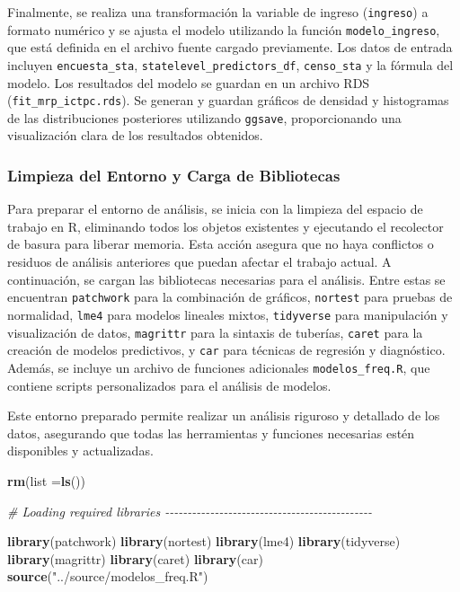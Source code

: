 \documentclass[
  12pt,
]{book}
\newenvironment{Shaded}{\begin{snugshade}}{\end{snugshade}}
\newcommand{\AttributeTok}[1]{\textcolor[rgb]{0.13,0.29,0.53}{#1}}
\newcommand{\CommentTok}[1]{\textcolor[rgb]{0.56,0.35,0.01}{\textit{#1}}}
\newcommand{\FunctionTok}[1]{\textcolor[rgb]{0.13,0.29,0.53}{\textbf{#1}}}
\newcommand{\NormalTok}[1]{#1}
\newcommand{\StringTok}[1]{\textcolor[rgb]{0.31,0.60,0.02}{#1}}
\begin{document}
Finalmente, se realiza una transformación la variable de ingreso (\texttt{ingreso}) a formato numérico y se ajusta el modelo utilizando la función \texttt{modelo\_ingreso}, que está definida en el archivo fuente cargado previamente. Los datos de entrada incluyen \texttt{encuesta\_sta}, \texttt{statelevel\_predictors\_df}, \texttt{censo\_sta} y la fórmula del modelo. Los resultados del modelo se guardan en un archivo RDS (\texttt{fit\_mrp\_ictpc.rds}). Se generan y guardan gráficos de densidad y histogramas de las distribuciones posteriores utilizando \texttt{ggsave}, proporcionando una visualización clara de los resultados obtenidos.

\hypertarget{limpieza-del-entorno-y-carga-de-bibliotecas-3}{%
\subsubsection*{Limpieza del Entorno y Carga de Bibliotecas}\label{limpieza-del-entorno-y-carga-de-bibliotecas-3}}

Para preparar el entorno de análisis, se inicia con la limpieza del espacio de trabajo en R, eliminando todos los objetos existentes y ejecutando el recolector de basura para liberar memoria. Esta acción asegura que no haya conflictos o residuos de análisis anteriores que puedan afectar el trabajo actual. A continuación, se cargan las bibliotecas necesarias para el análisis. Entre estas se encuentran \texttt{patchwork} para la combinación de gráficos, \texttt{nortest} para pruebas de normalidad, \texttt{lme4} para modelos lineales mixtos, \texttt{tidyverse} para manipulación y visualización de datos, \texttt{magrittr} para la sintaxis de tuberías, \texttt{caret} para la creación de modelos predictivos, y \texttt{car} para técnicas de regresión y diagnóstico. Además, se incluye un archivo de funciones adicionales \texttt{modelos\_freq.R}, que contiene scripts personalizados para el análisis de modelos.

Este entorno preparado permite realizar un análisis riguroso y detallado de los datos, asegurando que todas las herramientas y funciones necesarias estén disponibles y actualizadas.

\begin{Shaded}
\begin{Highlighting}[]
\FunctionTok{rm}\NormalTok{(}\AttributeTok{list =}\FunctionTok{ls}\NormalTok{())}

\CommentTok{\# Loading required libraries {-}{-}{-}{-}{-}{-}{-}{-}{-}{-}{-}{-}{-}{-}{-}{-}{-}{-}{-}{-}{-}{-}{-}{-}{-}{-}{-}{-}{-}{-}{-}{-}{-}{-}{-}{-}{-}{-}{-}{-}{-}{-}{-}{-}{-}{-}}

\FunctionTok{library}\NormalTok{(patchwork)}
\FunctionTok{library}\NormalTok{(nortest)}
\FunctionTok{library}\NormalTok{(lme4)}
\FunctionTok{library}\NormalTok{(tidyverse)}
\FunctionTok{library}\NormalTok{(magrittr)}
\FunctionTok{library}\NormalTok{(caret)}
\FunctionTok{library}\NormalTok{(car)}
\FunctionTok{source}\NormalTok{(}\StringTok{"../source/modelos\_freq.R"}\NormalTok{)}
\end{Highlighting}
\end{Shaded}
\end{document}
